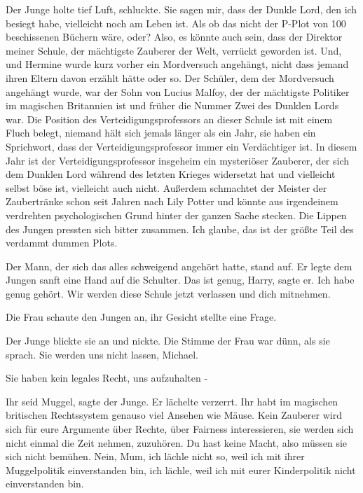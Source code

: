 Der Junge holte tief Luft, schluckte. \glqq{}Sie sagen mir, dass der Dunkle Lord,
den ich besiegt habe, vielleicht noch am Leben ist. Als ob das nicht der P-Plot
von 100 beschissenen Büchern wäre, oder? Also, es könnte auch sein, dass der
Direktor meiner Schule, der mächtigste Zauberer der Welt, verrückt geworden ist.
Und, und Hermine wurde kurz vorher ein Mordversuch angehängt, nicht dass jemand
ihren Eltern davon erzählt hätte oder so. Der Schüler, dem der Mordversuch
angehängt wurde, war der Sohn von Lucius Malfoy, der der mächtigste Politiker im
magischen Britannien ist und früher die Nummer Zwei des Dunklen Lords war. Die
Position des Verteidigungsprofessors an dieser Schule ist mit einem Fluch
belegt, niemand hält sich jemals länger als ein Jahr, sie haben ein Sprichwort,
dass der Verteidigungsprofessor immer ein Verdächtiger ist. In diesem Jahr ist
der Verteidigungsprofessor insgeheim ein mysteriöser Zauberer, der sich dem
Dunklen Lord während des letzten Krieges widersetzt hat und vielleicht selbst
böse ist, vielleicht auch nicht. Außerdem schmachtet der Meister der
Zaubertränke schon seit Jahren nach Lily Potter und könnte aus irgendeinem
verdrehten psychologischen Grund hinter der ganzen Sache stecken.\grqq{} Die
Lippen des Jungen pressten sich bitter zusammen. \glqq{}Ich glaube, das ist der
größte Teil des verdammt dummen Plots.\grqq{}

Der Mann, der sich das alles schweigend angehört hatte, stand auf. Er legte dem
Jungen sanft eine Hand auf die Schulter. \glqq{}Das ist genug, Harry\grqq{},
sagte er. \glqq{}Ich habe genug gehört. Wir werden diese Schule jetzt verlassen
und dich mitnehmen.\grqq{}

Die Frau schaute den Jungen an, ihr Gesicht stellte eine Frage.

Der Junge blickte sie an und nickte. Die Stimme der Frau war dünn, als sie
sprach. \glqq{}Sie werden uns nicht lassen, Michael.\grqq{}

\glqq{}Sie haben kein legales Recht, uns aufzuhalten -\grqq{}

\glqq{}Ihr seid Muggel\grqq{}, sagte der Junge. Er lächelte verzerrt. \glqq{}Ihr
habt im magischen britischen Rechtssystem genauso viel Ansehen wie Mäuse. Kein
Zauberer wird sich für eure Argumente über Rechte, über Fairness interessieren,
sie werden sich nicht einmal die Zeit nehmen, zuzuhören. Du hast keine Macht,
also müssen sie sich nicht bemühen. Nein, Mum, ich lächle nicht so, weil ich mit
ihrer Muggelpolitik einverstanden bin, ich lächle, weil ich mit eurer
Kinderpolitik nicht einverstanden bin.\grqq{}

